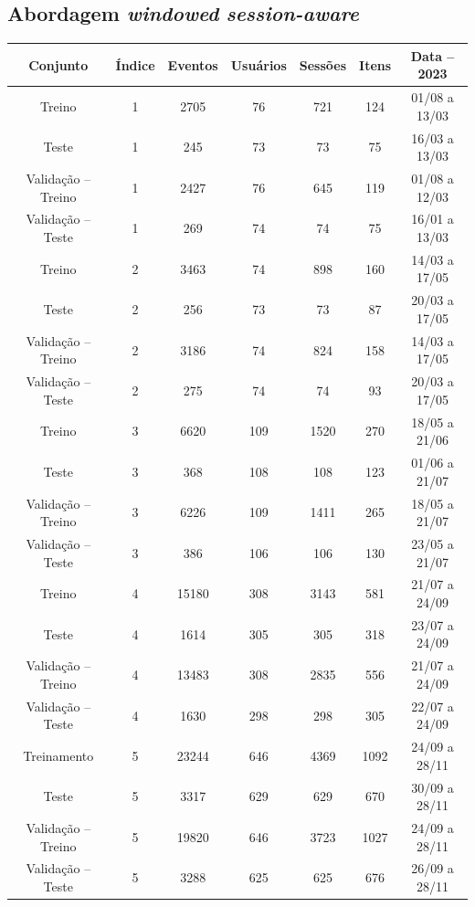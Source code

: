 \subsection{Abordagem \textit{windowed} \textit{session-aware}}

\begin{table}[htbp]
  \centering
  \begin{tabular}{|c|c|c|c|c|c|c|}
    \hline
    Conjunto & Índice & Eventos & Usuários & Sessões & Itens & Data -- 2023\\
    \hline
    Treino & 1 & 2705 & 76 & 721 & 124 & 01/08 a 13/03\\
    \hline
    Teste & 1 & 245 & 73 & 73 & 75 & 16/03 a 13/03\\
    \hline
    Validação -- Treino & 1 & 2427 & 76 & 645 & 119 & 01/08 a 12/03\\
    \hline
    Validação -- Teste & 1 & 269 & 74 & 74 & 75 & 16/01 a 13/03\\
    \hline
    Treino & 2 & 3463 & 74 & 898 & 160 & 14/03 a 17/05\\
    \hline
    Teste & 2 & 256 & 73 & 73 & 87 & 20/03 a 17/05\\
    \hline
    Validação -- Treino & 2 & 3186 & 74 & 824 & 158 & 14/03 a 17/05\\
    \hline
    Validação -- Teste & 2 & 275 & 74 & 74 & 93 & 20/03 a 17/05\\    
    \hline
    Treino & 3 & 6620 & 109 & 1520 & 270 & 18/05 a 21/06\\
    \hline
    Teste & 3 & 368 & 108 & 108 & 123 & 01/06 a 21/07\\
    \hline
    Validação -- Treino & 3 & 6226 & 109 & 1411 & 265 & 18/05 a 21/07\\
    \hline
    Validação -- Teste & 3 & 386 & 106 & 106 & 130 & 23/05 a 21/07\\
    \hline
    Treino & 4 & 15180 & 308 & 3143 & 581 & 21/07 a 24/09\\
    \hline
    Teste & 4 & 1614 & 305 & 305 & 318 & 23/07 a 24/09\\
    \hline
    Validação -- Treino & 4 & 13483 & 308 & 2835 & 556 & 21/07 a 24/09\\
    \hline
    Validação -- Teste & 4 & 1630 & 298 & 298 & 305 & 22/07 a 24/09\\
    \hline
    Treinamento & 5 & 23244 & 646 & 4369 & 1092 & 24/09 a 28/11\\
    \hline
    Teste & 5 & 3317 & 629 & 629 & 670 & 30/09 a 28/11\\
    \hline
    Validação -- Treino & 5 & 19820 & 646 & 3723 & 1027 & 24/09 a 28/11\\
    \hline
    Validação -- Teste & 5 & 3288 & 625 & 625 & 676 & 26/09 a 28/11\\
    \hline
  \end{tabular}
\end{table}

